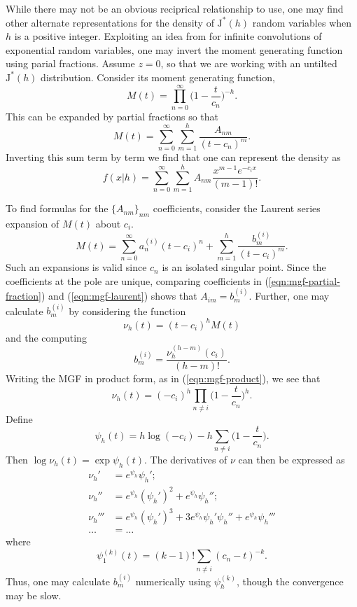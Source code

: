 \documentclass[12pt]{article}
\newcommand{\JJ}{\text{J}^*}
\begin{document}
While there may not be an obvious reciprical relationship to use, one may find
other alternate representations for the density of $\JJ(h)$ random variables
when $h$ is a positive integer.  Exploiting an idea from \cite{kent-1980} for
infinite convolutions of exponential random variables, one may invert the moment
generating function using parial fractions.  Assume $z=0$, so that we are
working with an untilted $\JJ(h)$ distribution.  Consider its moment generating
function,
\begin{equation}
\label{eqn:mgf-product}
M(t) = \prod_{n=0}^\infty \Big(1 - \frac{t}{c_n}\Big)^{-h}.
\end{equation}
This can be expanded by partial fractions so that
\begin{equation}
\label{eqn:mgf-partial-fraction}
M(t) = \sum_{n=0}^\infty \sum_{m=1}^h \frac{A_{nm}}{(t - c_n)^m}.
\end{equation}
Inverting this sum term by term we find that one can represent the density as
\[
f(x|h) = \sum_{n=0}^\infty \sum_{m=1}^h A_{nm} \frac{x^{m-1} e^{-c_i x}}{(m-1)!}.
\]

To find formulas for the $\{A_{nm}\}_{nm}$ coefficients, consider the Laurent
series expansion of $M(t)$ about $c_i$.
\begin{equation}
\label{eqn:mgf-laurent}
M(t) = \sum_{n=0}^\infty a_{n}^{(i)} (t - c_i)^n + \sum_{m=1}^h
\frac{b_m^{(i)}}{(t - c_i)^m}.
\end{equation}
Such an expansions is valid since $c_n$ is an isolated singular point.  Since
the coefficients at the pole are unique, comparing coefficients in
(\ref{eqn:mgf-partial-fraction}) and (\ref{eqn:mgf-laurent}) shows that $A_{im}
= b_m^{(i)}$.  Further, one may calculate $b_m^{(i)}$ by considering the
function
\[
\nu_h(t) = (t - c_i)^h M(t)
\]
and the computing
\[
b_m^{(i)} = \frac{\nu_h^{(h-m)}(c_i)}{(h-m)!}.
\]
Writing the MGF in product form, as in (\ref{eqn:mgf-product}), we see that
\[
\nu_h(t) = (-c_i)^h \prod_{n \neq i} \Big(1 - \frac{t}{c_n} \Big)^h.
\]
Define
\[
\psi_h(t) = h \log (-c_i) - h \sum_{n \neq i} \Big(1 - \frac{t}{c_n}\Big).
\]
Then $\log \nu_h(t) = \exp \psi_h(t)$.  The
derivatives of $\nu$ can then be expressed as
\begin{align*}
\nu_h' & = e^{\psi_h} \psi_h'; \\
\nu_h'' & = e^{\psi_h} (\psi_h')^2 + e^{\psi_h} \psi_h''; \\
\nu_h''' & = e^{\psi_h} (\psi_h')^3 + 3 e^{\psi_h} \psi_h' \psi_h'' + e^{\psi_h}
\psi_h''' \\
\ldots & = \ldots \; \; 
\end{align*}
where
\[
\psi_1^{(k)}(t) = (k-1)! \sum_{n \neq i} ( c_n - t )^{-k}.
\]
Thus, one may calculate $b_{m}^{(i)}$ numerically using $\psi_h^{(k)}$, though
the convergence may be slow.
\end{document}
